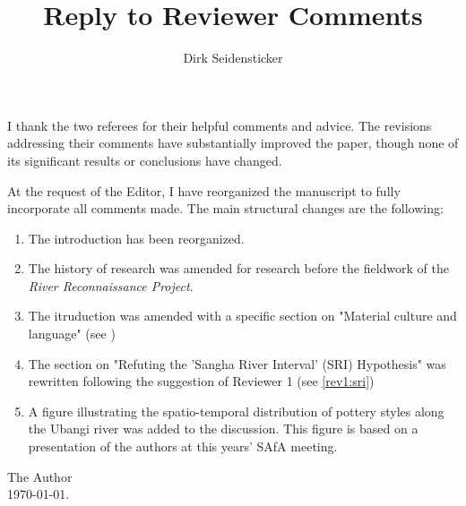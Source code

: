 

\usepackage[hidelinks]{hyperref}
\usepackage{natbib}

\usepackage{booktabs}
\usepackage{subcaption}

\renewcommand{\thefigure}{R\arabic{figure}}
\renewcommand{\thetable}{R\arabic{table}}

\title{Reply to Reviewer Comments}
\author{Dirk Seidensticker}


\maketitle

\noindent I thank the two referees for their helpful comments and advice. The revisions addressing their comments have substantially improved the paper, though none of its significant results or conclusions have changed.

At the request of the Editor, I have reorganized the manuscript to fully incorporate all comments made. The main structural changes are the following:\\

\begin{enumerate}
	\item The introduction has been reorganized.
	\item The history of research was amended for research before the fieldwork of the \textit{River Reconnaissance Project}.
	\item The itruduction was amended with a specific section on "Material culture and language" (see \label{rev1:linguistics})
	\item The section on "Refuting the 'Sangha River Interval' (SRI) Hypothesis" was rewritten following the suggestion of Reviewer 1 (see \ref{rev1:sri})
	\item A figure illustrating the spatio-temporal distribution of pottery styles along the Ubangi river was added to the discussion. This figure is based on a presentation of the authors at this years' SAfA meeting.
\end{enumerate}

The Author\\

\today.

